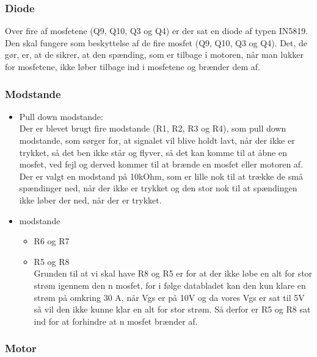 \subsubsection{Diode}
Over fire af mosfetene (Q9, Q10, Q3 og Q4) er der sat en diode af typen IN5819. Den skal fungere som beskyttelse af de fire mosfet (Q9, Q10, Q3 og Q4). Det, de gør, er, at de sikrer, at den spænding, som er tilbage i motoren, når man lukker for mosfetene, ikke løber tilbage ind i mosfetene og brænder dem af.

\subsubsection{Modstande}
\begin{itemize}
	\item Pull down modstande:\\
	Der er blevet brugt fire modstande (R1, R2, R3 og R4), som pull down modstande, som sørger for, at signalet vil blive holdt lavt, når der ikke er trykket, så det ben ikke står og flyver, så det kan komme til at åbne en mosfet, ved fejl og derved kommer til at brænde en mosfet eller motoren af. Der er valgt en modstand på 10kOhm, som er lille nok til at trække de små spændinger ned, når der ikke er trykket og den stor nok til at spændingen ikke løber der ned, når der er trykket.
	\item modstande
	\begin{itemize}
		\item R6 og R7
		
		\item R5 og R8\\
		Grunden til at vi skal have R8 og R5 er for at der ikke løbe en alt for stor strøm igennem  den n mosfet, for i følge databladet kan den kun klare en strøm på omkring 30 A, når Vgs er på 10V og da vores Vgs er sat til 5V så vil den ikke kunne klar en alt for stor strøm. Så derfor er R5 og R8 sat ind for at forhindre at n mosfet brænder af.
	\end{itemize}
	
	
\end{itemize}
\subsubsection{Motor}
